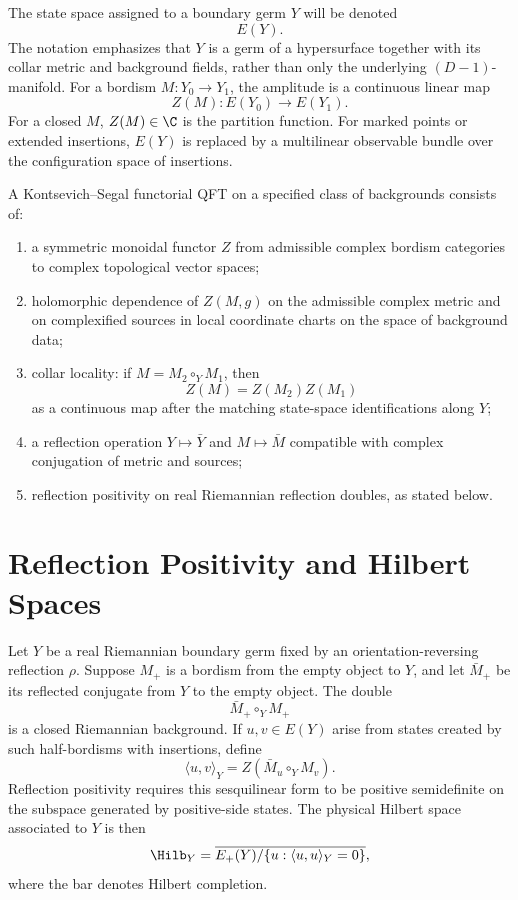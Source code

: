 The state space assigned to a boundary germ \(Y\) will be denoted
\[
  E(Y).
\]
The notation emphasizes that \(Y\) is a germ of a hypersurface together with
its collar metric and background fields, rather than only the underlying
\((D-1)\)-manifold.  For a bordism \(M:Y_0\to Y_1\), the amplitude is a
continuous linear map
\[
  Z(M):E(Y_0)\longrightarrow E(Y_1).
\]
For a closed \(M\), \(Z(M)\in\C\) is the partition function.  For marked
points or extended insertions, \(E(Y)\) is replaced by a multilinear
observable bundle over the configuration space of insertions.

\begin{definition}
\label{def:ks-functorial-qft}
A Kontsevich--Segal functorial QFT on a specified class of backgrounds
consists of:
\begin{enumerate}
\item a symmetric monoidal functor \(Z\) from admissible complex bordism
categories to complex topological vector spaces;
\item holomorphic dependence of \(Z(M,g)\) on the admissible complex metric
and on complexified sources in local coordinate charts on the space of
background data;
\item collar locality: if \(M=M_2\circ_Y M_1\), then
\[
  Z(M)=Z(M_2)Z(M_1)
\]
as a continuous map after the matching state-space identifications along
\(Y\);
\item a reflection operation \(Y\mapsto \bar Y\) and \(M\mapsto \bar M\)
compatible with complex conjugation of metric and sources;
\item reflection positivity on real Riemannian reflection doubles, as stated
below.
\end{enumerate}
\end{definition}

\section{Reflection Positivity and Hilbert Spaces}

Let \(Y\) be a real Riemannian boundary germ fixed by an orientation-reversing
reflection \(\rho\).  Suppose \(M_+\) is a bordism from the empty object to
\(Y\), and let \(\bar M_+\) be its reflected conjugate from \(Y\) to the empty
object.  The double
\[
  \bar M_+\circ_Y M_+
\]
is a closed Riemannian background.  If \(u,v\in E(Y)\) arise from states
created by such half-bordisms with insertions, define
\[
  \langle u,v\rangle_Y
  =
  Z(\bar M_u\circ_Y M_v).
\]
Reflection positivity requires this sesquilinear form to be positive
semidefinite on the subspace generated by positive-side states.  The physical
Hilbert space associated to \(Y\) is then
\begin{equation}
  \Hilb_Y
  =
  \overline{E_+(Y)/\{u:\langle u,u\rangle_Y=0\}},
  \label{eq:ks-hilbert-completion}
\end{equation}
where the bar denotes Hilbert completion.

